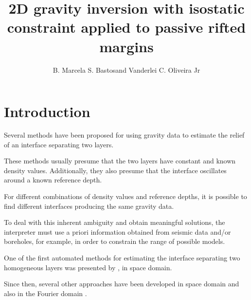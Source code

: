 \documentclass[manuscript]{geophysics}
\begin{document}
\title{2D gravity inversion with isostatic constraint applied to passive rifted margins}

\renewcommand{\thefootnote}{\fnsymbol{footnote}} 


\address{
\footnotemark[1]Observat\'{o}rio Nacional, \\
Department of Geophysics, \\
Rio de Janeiro, Brazil}
\author{B. Marcela S. Bastos\footnotemark[1] and Vanderlei C. Oliveira Jr\footnotemark[1]}


\maketitle

\begin{abstract}

\lipsum[1]

\end{abstract}

\section{Introduction}

Several methods have been proposed for using gravity data to estimate
the relief of an interface separating two layers. 

These methods usually presume that the two layers have constant and known
density values. Additionally, they also presume that the interface oscillates
around a known reference depth.

For different combinations of density values and reference depths, it is possible
to find different interfaces producing the same gravity data.

To deal with this inherent ambiguity \citep{roy1962, skeels1962} and obtain
meaningful solutions, the interpreter must use a priori information 
obtained from seismic data and/or boreholes, for example, in order to constrain
the range of possible models.


One of the first automated methods for estimating the interface separating
two homogeneous layers was presented by \citet{bott1960}, in space domain.

Since then, several other approaches have been developed in space domain \citep{tanner1967, dyrelius-vogel1972, pedersen1977, richardson-macinnes1989, barbosa-etal1997, barbosa-etal1999, barbosa-etal1999b, chakravarthi-sundararajan2007, silva-etal2010, camacho-etal2011, lima-etal2011, martins-etal2011, barnes-barraud2012, silva-etal2014, santos-etal2015, silva-santos2017} and also in the Fourier domain \citep{oldenburg1974, granser1987, reamer-ferguson1989,
guspi1993, braitenberg-etal1997, braitenberg-zadro1999}.
\end{document}

